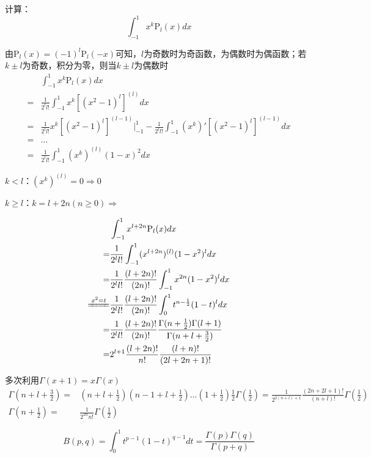 \begin{ex}计算：
$$
\int_{-1}^{1}x^k\mathrm{P}_l(x)dx
$$

由$\mathrm{P}_l(x)=(-1)^l\mathrm{P}_l(-x)$可知，$l$为奇数时为奇函数，为偶数时为偶函数；若$k\pm l$为奇数，积分为零，则当$k\pm l$为偶数时
$$\begin{aligned}
&\int_{-1}^{1}x^k\mathrm{P}_l(x)dx\\
=&\frac{1}{2^ll!}\int_{-1}^1x^k[(x^2-1)^l]^{(l)}dx\\
=&\frac{1}{2^ll!}x^k[(x^2-1)^l]^{(l-1)}|_{-1}^1-\frac{1}{2^ll!}\int_{-1}^1(x^k)'[(x^2-1)^l]^{(l-1)}dx\\
=&\dots\\
=&\frac{1}{2^ll!}\int_{-1}^1(x^k)^{(l)}(1-x)^2dx
\end{aligned}$$

$k<l$：$(x^k)^{(l)}=0\Rightarrow 0$

$k\ge l$：$k=l+2n(n\ge0)\Rightarrow$

$$\begin{aligned}
&\int_{-1}^1x^{l+2n}\mathrm{P}_l(x)dx\\
=&\frac{1}{2^ll!}\int_{-1}^1(x^{l+2n})^{(l)}(1-x^2)^ldx\\
=&\frac{1}{2^ll!}\frac{(l+2n)!}{(2n)!}\int_{-1}^1x^{2n}(1-x^2)^ldx\\
\xlongequal{x^2=t}&\frac{1}{2^ll!}\frac{(l+2n)!}{(2n)!}\int_{0}^1t^{n-\frac{1}{2}}(1-t)^ldx\\
=&\frac{1}{2^ll!}\frac{(l+2n)!}{(2n)!}\frac{\Gamma(n+\frac{1}{2})\Gamma(l+1)}{\Gamma(n+l+\frac{3}{2})}\\
=&2^{l+1}\frac{(l+2n)!}{n!}\frac{(l+n)!}{(2l+2n+1)!}
\end{aligned}$$
\begin{rem}
多次利用$\Gamma(x+1)=x\Gamma(x)$
$$
\begin{aligned}
\Gamma(n+l+\tfrac{3}{2})
=&(n+l+\tfrac{1}{2})(n-1+l+\tfrac{1}{2})\dots(1+\tfrac{1}{2})\frac{1}{2}\Gamma(\tfrac{1}{2})
=\frac{1}{2^{2(n+l)+1}}\frac{(2n+2l+1)!}{(n+l)!}\Gamma(\tfrac{1}{2})\\
\Gamma(n+\tfrac{1}{2})=&\frac{1}{2^{2n}n!}\Gamma(\tfrac{1}{2})
\end{aligned}$$


\end{rem}
\begin{dfn}[Beta函数]
    $$B(p,q)=\int_0^1t^{p-1}(1-t)^{q-1}dt=\frac{\Gamma(p)\Gamma(q)}{\Gamma(p+q)}$$
\end{dfn}

\end{ex}

